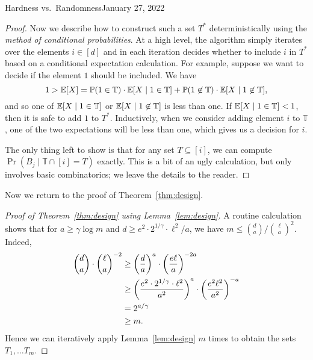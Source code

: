 \begin{lecture}{2}{Hardness vs.\ Randomness}{January 27, 2022}
\begin{proof}
  Now we describe how to construct such a set $T^*$ deterministically using the
  \emph{method of conditional probabilities}. At a high level, the algorithm
  simply iterates over the elements $i \in [d]$ and in each iteration decides
  whether to include $i$ in $T^*$ based on a conditional expectation
  calculation. For example, suppose we want to decide if the element $1$ should
  be included. We have \[
    1 > \Exp\brac*{X} = \Pr(1 \in \mathbb{T}) \cdot \Exp\brac*{X \mid 1 \in \mathbb{T}} 
      + \Pr(1 \not\in \mathbb{T}) \cdot \Exp\brac*{X \mid 1 \not\in \mathbb{T}},
  \]
  and so one of $\Exp\brac{X \mid 1 \in \mathbb{T}}$ or $\Exp\brac{X \mid 1 \not\in
  \mathbb{T}}$ is less than one. If $\Exp\brac{X \mid 1 \in \mathbb{T}} < 1$,
  then it is safe to add $1$ to $T^*$. Inductively, when we consider adding
  element $i$ to $\mathbb{T}$, one of the two expectations will be less than
  one, which gives us a decision for $i$.

  The only thing left to show is that for any set $T \subseteq [i]$, we can
  compute $\Pr(B_j \mid \mathbb{T} \cap [i] = T)$ exactly. This is a bit of an
  ugly calculation, but only involves basic combinatorics; we leave the details
  to the reader.
\end{proof}

Now we return to the proof of Theorem~\ref{thm:design}.

\begin{proof}[Proof of Theorem~\ref{thm:design} using Lemma~\ref{lem:design}]
  A routine calculation shows that for $a \ge \gamma \log{m}$ and $d \ge e^2
  \cdot 2^{1/\gamma} \cdot \ell^2/a$, we have $m \le \binom{d}{a} /
  \binom{\ell}{a}^2$. Indeed,
  \begin{align*}
    \binom{d}{a} \cdot \binom{\ell}{a}^{-2}
    &\ge \paren*{\frac{d}{a}}^a \cdot \paren*{\frac{e \ell}{a}}^{-2a}\\
    &\ge \paren*{\frac{e^2 \cdot 2^{1/\gamma} \cdot \ell^2}{a^2}}^{a} \cdot \paren*{\frac{e^2 \ell^2}{a^2}}^{-a}\\
    &= 2^{a / \gamma}\\
    &\ge m.
  \end{align*}
  Hence we can iteratively apply Lemma~\ref{lem:design} $m$ times to obtain the
  sets $T_1, \dots T_m$.
\end{proof}

\end{lecture}
